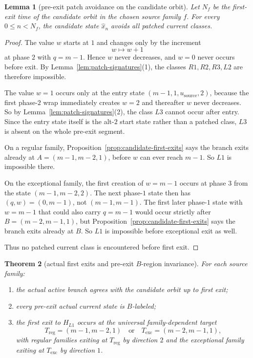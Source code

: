 \documentclass[11pt]{article}
\newtheorem{theorem}{Theorem}[section]
\newtheorem{lemma}[theorem]{Lemma}
\begin{document}
\begin{lemma}[pre-exit patch avoidance on the candidate orbit]\label{lem:patch-avoidance}
Let $N_f$ be the first-exit time of the candidate orbit in the chosen source
family $f$.
For every $0\le n<N_f$, the candidate state $\widehat x_n$ avoids all patched
current classes.
\end{lemma}

\begin{proof}
The value $w$ starts at $1$ and changes only by the increment
\[
w\mapsto w+1
\]
at phase $2$ with $q=m-1$.
Hence $w$ never decreases, and $w=0$ never occurs before exit.
By Lemma~\ref{lem:patch-signatures}(1), the classes $R1,R2,R3,L2$ are therefore
impossible.

The value $w=1$ occurs only at the entry state $(m-1,1,u_{\mathrm{source}},2)$,
because the first phase-$2$ wrap immediately creates $w=2$ and thereafter $w$
never decreases.
So by Lemma~\ref{lem:patch-signatures}(2), the class $L3$ cannot occur after
entry.
Since the entry state itself is the alt-$2$ start state rather than a patched
class, $L3$ is absent on the whole pre-exit segment.

On a regular family, Proposition~\ref{prop:candidate-first-exits} says the
branch exits already at $A=(m-1,m-2,1)$, before $w$ can ever reach $m-1$.
So $L1$ is impossible there.

On the exceptional family, the first creation of $w=m-1$ occurs at phase $3$
from the state $(m-1,m-2,2)$.
The next phase-$1$ state then has $(q,w)=(0,m-1)$, not $(m-1,m-1)$.
The first later phase-$1$ state with $w=m-1$ that could also carry $q=m-1$
would occur strictly after $B=(m-2,m-1,1)$, but
Proposition~\ref{prop:candidate-first-exits} says the branch exits already at
$B$.
So $L1$ is impossible before exceptional exit as well.

Thus no patched current class is encountered before first exit.
\end{proof}

\begin{theorem}[actual first exits and pre-exit $B$-region invariance]
\label{thm:actual-first-exits}
For each source family:
\begin{enumerate}[label=\textup{(\arabic*)},leftmargin=2.5em]
\item the actual active branch agrees with the candidate orbit up to first
      exit;
\item every pre-exit actual current state is $B$-labeled;
\item the first exit to $H_{L1}$ occurs at the universal family-dependent
      target
      \[
      T_{\mathrm{reg}}=(m-1,m-2,1)
      \quad\text{or}\quad
      T_{\mathrm{exc}}=(m-2,m-1,1),
      \]
      with regular families exiting at $T_{\mathrm{reg}}$ by direction $2$ and
      the exceptional family exiting at $T_{\mathrm{exc}}$ by direction $1$.
\end{enumerate}
\end{theorem}
\end{document}
